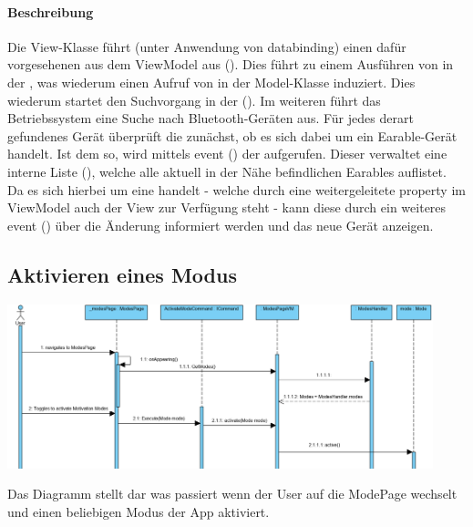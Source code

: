 \documentclass[../entwurf.tex]{subfiles}
\begin{document}
\paragraph{Beschreibung}
Die View-Klasse  führt (unter Anwendung von \Gls{databinding}) einen dafür vorgesehenen  aus dem ViewModel aus ().
Dies führt zu einem Ausführen von  in der ,
was wiederum einen Aufruf von  in der Model-Klasse  induziert.
Dies wiederum startet den Suchvorgang in der  ().
Im weiteren führt das Betriebssystem eine Suche nach Bluetooth-Geräten aus.
Für jedes derart gefundenes Gerät überprüft die  zunächst, ob es sich dabei um ein Earable-Gerät handelt.
Ist dem so, wird mittels \Gls{event} () der  aufgerufen.
Dieser verwaltet eine interne Liste (), welche alle aktuell in der Nähe befindlichen Earables auflistet.
Da es sich hierbei um eine  handelt - welche durch eine weitergeleitete \Gls{property} im ViewModel auch der View zur Verfügung steht -
kann diese durch ein weiteres \Gls{event} () über die Änderung informiert werden und das neue Gerät anzeigen.

\subsection{Aktivieren eines Modus}
\begin{center}
	\includegraphics[page=1,width=350pt,keepaspectratio]{../graphics/sequenz_diagramme/ActivateModeDia.png}
\end{center}
Das Diagramm stellt dar was passiert wenn der User auf die ModePage wechselt und einen beliebigen Modus der App aktiviert.
\end{document}
